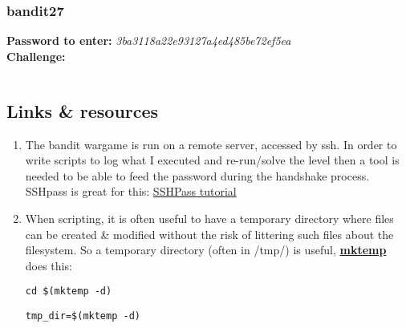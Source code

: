 \documentclass[a4paper]{article}
\newcommand{\pass}[1]{\textbf{Password to enter:} \textit{#1}\\}
\newcommand{\chall}{\textbf{Challenge:} }
\begin{document}
\subsubsection{bandit27}
\pass{3ba3118a22e93127a4ed485be72ef5ea}
\chall 
\begin{lstlisting}
\end{lstlisting}


\subsection*{Links \& resources}
\begin{enumerate}
\item The bandit wargame is run on a remote server, accessed by ssh. In order to write scripts to log what I executed and re-run/solve the level then a tool is needed to be able to feed the password during the handshake process. SSHpass is great for this: \href{https://askubuntu.com/questions/224181/how-do-i-include-a-password-with-ssh-command-want-to-make-shell-script}{SSHPass tutorial} 

\item When scripting, it is often useful to have a temporary directory where files can be created \& modified without the risk of littering such files about the filesystem. So a temporary directory (often in /tmp/) is useful, \href{https://code-maven.com/create-temporary-directory-on-linux-using-bash}{\textbf{mktemp}} does this:
	\begin{lstlisting}[title=move to the new temporary directory]
	cd $(mktemp -d)
	\end{lstlisting}
	\begin{lstlisting}[title=store the new temporary directory path]
	tmp_dir=$(mktemp -d)
	\end{lstlisting}
\end{enumerate}
\end{document}
